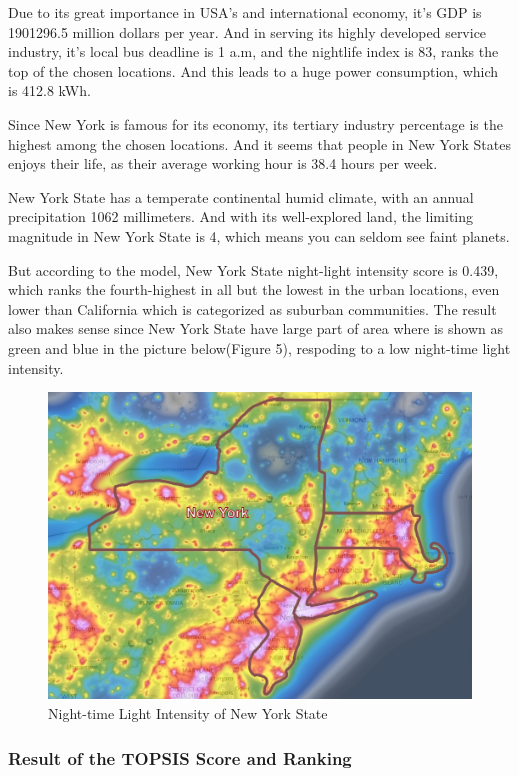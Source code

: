 Due to its great importance in USA's and international economy, it's GDP is 1901296.5 million dollars per year. And in serving its highly developed service industry, it's local bus deadline is 1 a.m, and the nightlife index is 83, ranks the top of the chosen locations. And this leads to a huge power consumption, which is 412.8 kWh. 

Since New York is famous for its economy, its tertiary industry percentage is the highest among the chosen locations. And it seems that people in New York States enjoys their life, as their average working hour is 38.4 hours per week.

New York State has a temperate continental humid climate, with an annual precipitation 1062 millimeters. And with its well-explored land, the limiting magnitude in New York State is 4, which means you can seldom see faint planets.

But according to the model, New York State night-light intensity score is 0.439, which ranks the fourth-highest in all but the lowest in the urban locations, even lower than California which is categorized as suburban communities. The result also makes sense since New York State have large part of area where is shown as green and blue in the picture below(Figure 5), respoding to a low night-time light intensity.

\begin{figure}[H]\centering
    \includegraphics[width=1\textwidth]{figures/texted/New_York.jpg}
    \caption{Night-time Light Intensity of New York State} \label{fig:figure5}
\end{figure}

\subsubsection{Result of the TOPSIS Score and Ranking}

